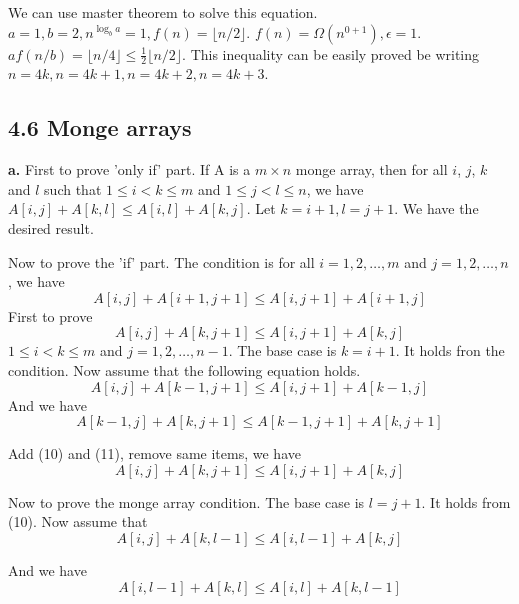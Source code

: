 \documentclass{book}
\begin{document}
\begin{CJK}{UTF8}{gkai}
\begin{flushleft}
\begin{itemize}
We can use master theorem to solve this equation. $a = 1, b = 2, n^{\log_b a} = 
1, f(n) = \lfloor n/2 \rfloor$. $f(n) = \Omega(n^{0+1}), \epsilon=1$. $af(n/b) = 
\lfloor n/4 \rfloor \le \frac{1}{2} \lfloor n/2 \rfloor$. This inequality can be 
easily proved be writing $n=4k, n=4k+1, n=4k+2, n=4k+3$.
\end{itemize}
\end{flushleft}

\subsection*{4.6 Monge arrays}
\textbf{a.} First to prove 'only if' part. If A is a $m \times n$ monge array, 
then for all $i$, $j$, $k$ and $l$ such that $1\le i < k \le m$ and $1\le j < l 
\le n$, we have $A[i,j] + A[k,l] \le A[i,l] + A[k,j]$. Let $k=i+1, l=j+1$. We 
have the desired result.

Now to prove the 'if' part. The condition is for all $i = 1, 2, \dots, m$ and $j 
= 1,2,\dots,n$, we have
\begin{equation*}
A[i,j] + A[i+1,j+1] \le A[i,j+1] + A[i+1, j]
\end{equation*}
First to prove
\begin{equation}
A[i,j] + A[k,j+1] \le A[i,j+1] + A[k, j]
\end{equation}
$1\le i < k \le m$ and $j = 1,2,\dots,n-1$. The base case is $k=i+1$. It holds 
fron the condition. Now assume that the following equation holds.
\begin{equation}
A[i,j] + A[k-1,j+1] \le A[i,j+1] + A[k-1, j]
\end{equation}
And we have
\begin{equation}
A[k-1, j] + A[k, j+1] \le A[k-1,j+1] + A[k,j+1]
\end{equation}

Add (10) and (11), remove same items, we have
\begin{equation*}
A[i,j] + A[k,j+1] \le A[i,j+1] + A[k, j]
\end{equation*}

Now to prove the monge array condition. The base case is $l=j+1$. It holds from 
(10). Now assume that
\begin{equation}
A[i,j] + A[k,l-1] \le A[i,l-1] + A[k,j]
\end{equation}

And we have
\begin{equation*}
A[i,l-1] + A[k, l] \le A[i,l] + A[k, l-1]
\end{equation*}


\end{CJK}
\end{document}
